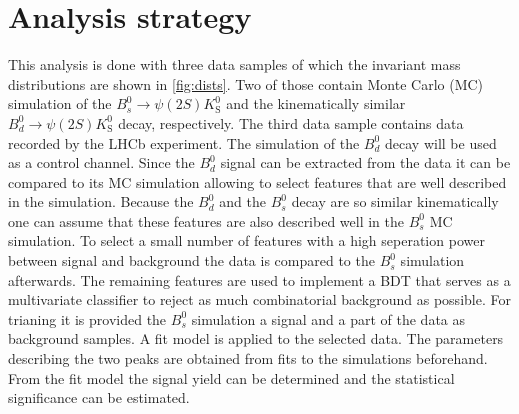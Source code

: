 \section{Analysis strategy}
\label{sec:Durchführung}
This analysis is done with three data samples of which the invariant mass distributions are shown in \autoref{fig:dists}. Two of those contain Monte Carlo (MC) simulation of the $B^0_s \to \psi(2S)K^0_\mathrm{S}$ and the kinematically similar $B^0_d \to \psi(2S)K^0_\mathrm{S}$ decay, respectively. The third data sample contains data recorded by the LHCb experiment.
The simulation of the $B^0_d$ decay will be used as a control channel.
Since the $B^0_d$ signal can be extracted from the data it can be compared to its MC simulation allowing to select features that are well described in the simulation. Because the $B^0_d$ and the $B^0_s$ decay are so similar kinematically one can assume that these features are also described well in the $B^0_s$ MC simulation.
To select a small number of features with a high seperation power between signal and background the data is compared to the $B^0_s$ simulation afterwards.
The remaining features are used to implement a BDT that serves as a multivariate classifier to reject as much combinatorial background as possible. For trianing it is provided the $B^0_s$ simulation a signal and a part of the data as background samples.
A fit model is applied to the selected data. The parameters describing the two peaks are obtained from fits to the simulations beforehand.
From the fit model the signal yield can be determined and the statistical significance can be estimated.

